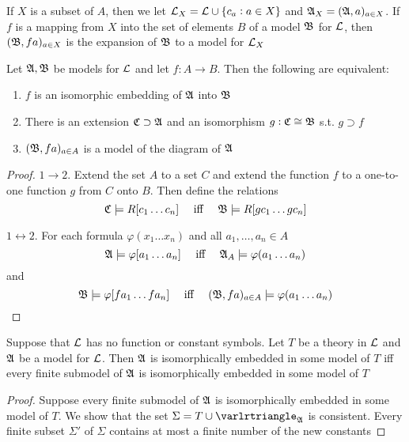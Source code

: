 \documentclass[11pt]{article}
\begin{document}
If \(X\) is a subset of \(A\), then we let \(\mathcal{L}_X=\mathcal{L}\cup\{c_a:a\in
   X\}\) and \(\mathfrak{A}_X=(\mathfrak{A},a)_{a\in X}\). If \(f\) is a mapping from \(X\) into
the set of elements \(B\) of a model \(\mathfrak{B}\) for \(\mathcal{L}\), then
\((\mathfrak{B},fa)_{a\in X}\) is the expansion of \(\mathfrak{B}\) to a model for \(\mathcal{L}_X\)

\begin{proposition}[]
Let \(\mathfrak{A},\mathfrak{B}\) be models for \(\mathcal{L}\) and let \(f:A\to B\). Then the
following are equivalent:
\begin{enumerate}
\item \(f\) is an isomorphic embedding of \(\mathfrak{A}\) into \(\mathfrak{B}\)
\item There is an extension \(\mathfrak{C}\supset\mathfrak{A}\) and an isomorphism
\(g:\mathfrak{C}\cong\mathfrak{B}\) s.t. \(g\supset f\)
\item \((\mathfrak{B},fa)_{a\in A}\) is a model of the diagram of \(\mathfrak{A}\)
\end{enumerate}
\end{proposition}

\begin{proof}
\(1\to2\). Extend the set \(A\) to a set \(C\) and extend the function \(f\)
to a one-to-one function \(g\) from \(C\) onto \(B\). Then define the
relations
\begin{equation*}
\mathfrak{C}\models R[c_1\dots c_n] \quad\text{ iff }\quad
\mathfrak{B}\models R[gc_1\dots gc_n]
\end{equation*}

\(1\leftrightarrow2\). For each formula \(\varphi(x_1\dots x_n)\) and all
\(a_1,\dots,a_n\in A\)
\begin{equation*}
\mathfrak{A}\models\varphi[a_1\dots a_n] \quad\text{ iff }\quad
\mathfrak{A}_A\models\varphi(a_1\dots a_n)
\end{equation*}
and
\begin{equation*}
\mathfrak{B}\models\varphi[fa_1\dots fa_n] \quad\text{ iff }\quad
(\mathfrak{B},fa)_{a\in A}\models\varphi(a_1\dots a_n)
\end{equation*}
\end{proof}

\begin{corollary}[]
Suppose that \(\mathcal{L}\) has no function or constant symbols. Let \(T\) be a
theory in \(\mathcal{L}\) and \(\mathfrak{A}\) be a model for \(\mathcal{L}\). Then \(\mathfrak{A}\) is
isomorphically embedded in some model of \(T\) iff every finite submodel of
\(\mathfrak{A}\) is isomorphically embedded in some model of \(T\)
\end{corollary}

\begin{proof}
Suppose every finite submodel of \(\mathfrak{A}\) is isomorphically embedded in some
model of \(T\). We show that the set \(\Sigma=T\cup\varlrtriangle_{\fA}\) is
consistent. Every finite subset \(\Sigma'\) of \(\Sigma\) contains at most a finite
number of the new constants
\end{proof}
\end{document}
